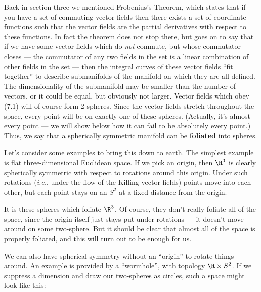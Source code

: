 Back in section three we mentioned Frobenius's Theorem, which states
that if you have a set of commuting vector fields then there exists a
set of coordinate
functions such that the vector fields are the partial derivatives
with respect to these functions.  In fact the theorem does not stop 
there, but goes on to say that if we have some vector fields which do
{\it not} commute, but whose commutator closes --- the commutator of
any two fields in the set is a linear combination of other fields in
the set --- then the integral curves of these vector fields ``fit
together'' to describe submanifolds of the manifold on which they are
all defined.  The dimensionality of the submanifold may be smaller 
than the number of vectors, or it could be equal, but obviously not
larger.  Vector fields which obey (7.1) will of course form 2-spheres.
Since the vector fields stretch throughout the space, every point will
be on exactly one of these spheres.  (Actually, it's almost every point
--- we will show below how it can fail to be absolutely every point.)
Thus, we say that a spherically symmetric manifold can be {\bf foliated}
into spheres.  

Let's consider some examples to bring this down to earth.  The simplest
example is flat three-dimensional Euclidean space.  If we pick an origin,
then $\R^3$ is clearly spherically symmetric with respect to rotations
around this origin.  
Under such rotations ({\it i.e.}, under the 
flow of the Killing vector fields) points move into each other, but
each point stays on an $S^2$ at a fixed distance from the origin.

\begin{figure}[h]
  \centerline{
  }
\end{figure}

\noindent
It is these spheres which foliate $\R^3$.
Of course, they don't really foliate all of the space, since
the origin itself just stays put under rotations --- it doesn't move
around on some two-sphere.  But it should be clear that almost all of
the space is properly foliated, and this will turn out to be enough for
us.  

We can also have spherical symmetry without an ``origin'' to rotate
things around.  An example is provided by a ``wormhole'', with topology
$\R\times S^2$.  If we suppress a dimension and draw our two-spheres
as circles, such a space might look like this:

\eject

\begin{figure}[h]
  \centerline{
  }
\end{figure}

